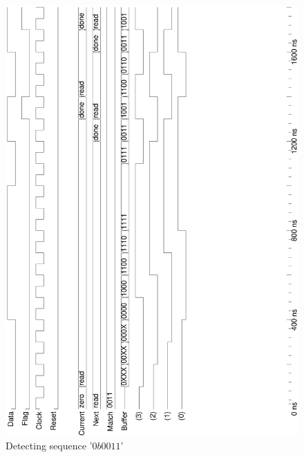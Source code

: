\documentclass[10pt,a4paper]{report}
\begin{document}
\begin{figure} \center

\includegraphics[scale=0.49,angle=-90]{graphs/seq_test1.ps}
\caption{\small{Detecting sequence '$0b0011$'}} \label{wave:usd:t1w1}


\end{figure}
\end{document}
